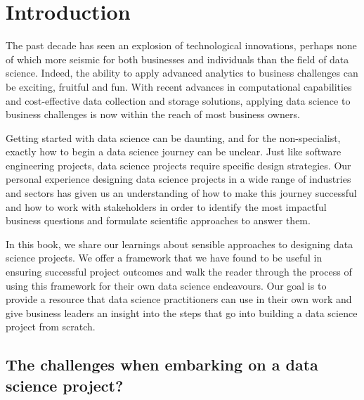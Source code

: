 \documentclass[
]{book}
\begin{document}
\hypertarget{introduction}{%
\chapter{Introduction}\label{introduction}}

The past decade has seen an explosion of technological innovations, perhaps none of which more seismic for both businesses and individuals than the field of data science. Indeed, the ability to apply advanced analytics to business challenges can be exciting, fruitful and fun. With recent advances in computational capabilities and cost-effective data collection and storage solutions, applying data science to business challenges is now within the reach of most business owners.

Getting started with data science can be daunting, and for the non-specialist, exactly how to begin a data science journey can be unclear. Just like software engineering projects, data science projects require specific design strategies. Our personal experience designing data science projects in a wide range of industries and sectors has given us an understanding of how to make this journey successful and how to work with stakeholders in order to identify the most impactful business questions and formulate scientific approaches to answer them.

In this book, we share our learnings about sensible approaches to designing data science projects. We offer a framework that we have found to be useful in ensuring successful project outcomes and walk the reader through the process of using this framework for their own data science endeavours. Our goal is to provide a resource that data science practitioners can use in their own work and give business leaders an insight into the steps that go into building a data science project from scratch.

\hypertarget{the-challenges-when-embarking-on-a-data-science-project}{%
\section{The challenges when embarking on a data science project?}\label{the-challenges-when-embarking-on-a-data-science-project}}
\end{document}
